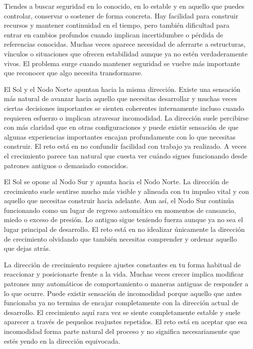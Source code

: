 \documentclass[11pt,a4paper]{article}
\begin{document}
Tiendes a buscar seguridad en lo conocido, en lo estable y en aquello que puedes controlar, conservar o sostener de forma concreta. Hay facilidad para construir recursos y mantener continuidad en el tiempo, pero también dificultad para entrar en cambios profundos cuando implican incertidumbre o pérdida de referencias conocidas. Muchas veces aparece necesidad de aferrarte a estructuras, vínculos o situaciones que ofrecen estabilidad aunque ya no estén verdaderamente vivos. El problema surge cuando mantener seguridad se vuelve más importante que reconocer que algo necesita transformarse.

El Sol y el Nodo Norte apuntan hacia la misma dirección. Existe una sensación más natural de avanzar hacia aquello que necesitas desarrollar y muchas veces ciertas decisiones importantes se sienten coherentes internamente incluso cuando requieren esfuerzo o implican atravesar incomodidad. La dirección suele percibirse con más claridad que en otras configuraciones y puede existir sensación de que algunas experiencias importantes encajan profundamente con lo que necesitas construir. El reto está en no confundir facilidad con trabajo ya realizado. A veces el crecimiento parece tan natural que cuesta ver cuándo sigues funcionando desde patrones antiguos o demasiado conocidos.

El Sol se opone al Nodo Sur y apunta hacia el Nodo Norte. La dirección de crecimiento suele sentirse mucho más visible y alineada con tu impulso vital y con aquello que necesitas construir hacia adelante. Aun así, el Nodo Sur continúa funcionando como un lugar de regreso automático en momentos de cansancio, miedo o exceso de presión. Lo antiguo sigue teniendo fuerza aunque ya no sea el lugar principal de desarrollo. El reto está en no idealizar únicamente la dirección de crecimiento olvidando que también necesitas comprender y ordenar aquello que dejas atrás.

La dirección de crecimiento requiere ajustes constantes en tu forma habitual de reaccionar y posicionarte frente a la vida. Muchas veces crecer implica modificar patrones muy automáticos de comportamiento o maneras antiguas de responder a lo que ocurre. Puede existir sensación de incomodidad porque aquello que antes funcionaba ya no termina de encajar completamente con la dirección actual de desarrollo. El crecimiento aquí rara vez se siente completamente estable y suele aparecer a través de pequeños reajustes repetidos. El reto está en aceptar que esa incomodidad forma parte natural del proceso y no significa necesariamente que estés yendo en la dirección equivocada.
\end{document}
